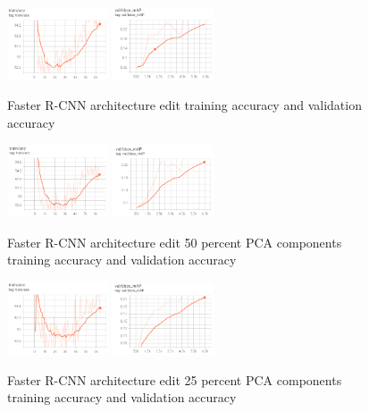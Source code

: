 \documentclass[10pt,twocolumn,letterpaper]{article}
\begin{document}
\begin{figure}[ht]
    \centering
    {{\includegraphics[width=3cm]{docs/latex/images/larry/edit_base_results_train_acc.png} }}
    \qquad
    {{\includegraphics[width=3cm]{docs/latex/images/larry/edit_base_results_val.png} }}
    \caption{Faster R-CNN architecture edit training accuracy and validation accuracy}
    \label{fig:example7}
\end{figure}

\begin{figure}[ht]
    \centering
    {{\includegraphics[width=3cm]{docs/latex/images/larry/edit_50_results_train_acc.png} }}
    \qquad
    {{\includegraphics[width=3cm]{docs/latex/images/larry/edit_50_results_val.png} }}
    \caption{Faster R-CNN architecture edit 50 percent PCA components training accuracy and validation accuracy}
    \label{fig:example8}
\end{figure}

\begin{figure}[ht]
    \centering
    {{\includegraphics[width=3cm]{docs/latex/images/larry/edit_25_results_train_acc.png} }}
    \qquad
    {{\includegraphics[width=3cm]{docs/latex/images/larry/edit_25_results_val.png} }}
    \caption{Faster R-CNN architecture edit 25 percent PCA components training accuracy and validation accuracy}
    \label{fig:example9}
\end{figure}
\end{document}
